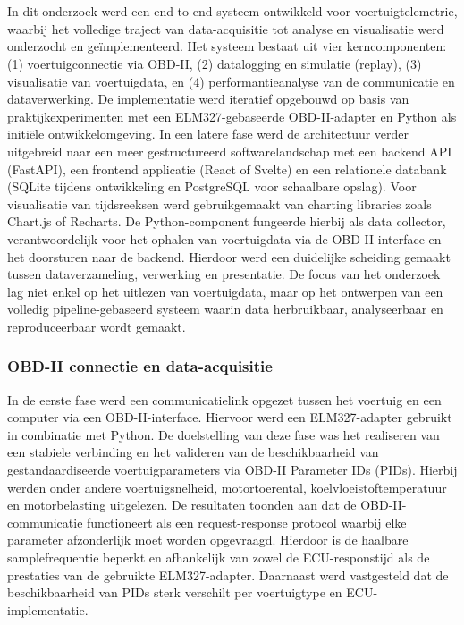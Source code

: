 
\chapter{}%
\label{ch:methodologie}


In dit onderzoek werd een end-to-end systeem ontwikkeld voor voertuigtelemetrie, waarbij het volledige traject van data-acquisitie tot analyse en visualisatie werd onderzocht en geïmplementeerd. Het systeem bestaat uit vier kerncomponenten: (1) voertuigconnectie via OBD-II, (2) datalogging en simulatie (replay), (3) visualisatie van voertuigdata, en (4) performantieanalyse van de communicatie en dataverwerking.
De implementatie werd iteratief opgebouwd op basis van praktijkexperimenten met een ELM327-gebaseerde OBD-II-adapter en Python als initiële ontwikkelomgeving. In een latere fase werd de architectuur verder uitgebreid naar een meer gestructureerd softwarelandschap met een backend API (FastAPI), een frontend applicatie (React of Svelte) en een relationele databank (SQLite tijdens ontwikkeling en PostgreSQL voor schaalbare opslag). Voor visualisatie van tijdsreeksen werd gebruikgemaakt van charting libraries zoals Chart.js of Recharts.
De Python-component fungeerde hierbij als data collector, verantwoordelijk voor het ophalen van voertuigdata via de OBD-II-interface en het doorsturen naar de backend. Hierdoor werd een duidelijke scheiding gemaakt tussen dataverzameling, verwerking en presentatie.
De focus van het onderzoek lag niet enkel op het uitlezen van voertuigdata, maar op het ontwerpen van een volledig pipeline-gebaseerd systeem waarin data herbruikbaar, analyseerbaar en reproduceerbaar wordt gemaakt.

\subsection{OBD-II connectie en data-acquisitie}

In de eerste fase werd een communicatielink opgezet tussen het voertuig en een computer via een OBD-II-interface. Hiervoor werd een ELM327-adapter gebruikt in combinatie met Python.
De doelstelling van deze fase was het realiseren van een stabiele verbinding en het valideren van de beschikbaarheid van gestandaardiseerde voertuigparameters via OBD-II Parameter IDs (PIDs). Hierbij werden onder andere voertuigsnelheid, motortoerental, koelvloeistoftemperatuur en motorbelasting uitgelezen.
De resultaten toonden aan dat de OBD-II-communicatie functioneert als een request-response protocol waarbij elke parameter afzonderlijk moet worden opgevraagd. Hierdoor is de haalbare samplefrequentie beperkt en afhankelijk van zowel de ECU-responstijd als de prestaties van de gebruikte ELM327-adapter. Daarnaast werd vastgesteld dat de beschikbaarheid van PIDs sterk verschilt per voertuigtype en ECU-implementatie.

